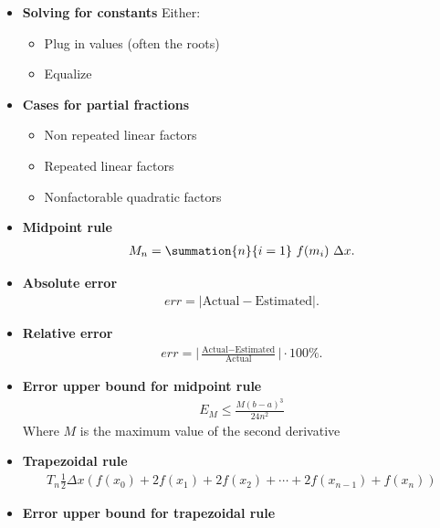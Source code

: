 \documentclass{report}
\begin{document}
\begin{itemize}
        \item \textbf{Solving for constants}
            Either:
            \begin{itemize}
                \item Plug in values (often the roots)
                \item Equalize 
            \end{itemize}
        \item \textbf{Cases for partial fractions}
            \begin{itemize}
                \item Non repeated linear factors
                \item Repeated linear factors
                \item Nonfactorable quadratic factors
            \end{itemize}
        \item \textbf{Midpoint rule}
            \begin{align*}
                M_{n} = \summation{n}{i=1}\ f(m_{i})\ \Delta x 
            .\end{align*}
        \item \textbf{Absolute error}
            \begin{align*}
                err = \bigg|\text{Actual} - \text{Estimated}\bigg|
            .\end{align*}
        \item \textbf{Relative error}
            \begin{align*}
                err = \bigg|\frac{\text{Actual} - \text{Estimated}}{\text{Actual}}\bigg| \cdot 100\%
            .\end{align*}
        \item \textbf{Error upper bound for midpoint rule}
            \begin{align*}
                E_{M} \leq \frac{M(b-a)^3}{24n^2}
            \end{align*}
            Where $M$ is the maximum value of the second derivative
        \item \textbf{Trapezoidal rule}
            \begin{align*}
                T_n \frac{1}{2} \Delta x \left( f(x_0) + 2f(x_1) + 2f(x_2) + \cdots + 2f(x_{n-1}) + f(x_n) \right)
            \end{align*}
        \item \textbf{Error upper bound for trapezoidal rule}
            \begin{align*}

\end{align*}
\end{itemize}
\end{document}
